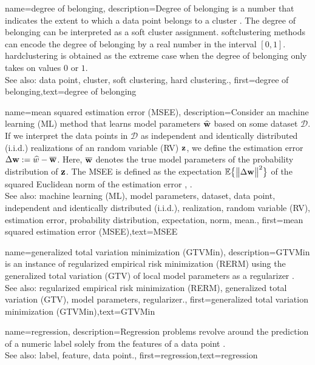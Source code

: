 {name={degree of belonging},
	description={Degree of belonging is a number that indicates the extent to which a data point 
		belongs to a cluster \cite[Ch. 8]{MLBasics}. The degree of belonging can be 
		interpreted as a soft cluster assignment. \Gls{softclustering} methods can 
		encode the degree of belonging by a real number in the interval $[0,1]$. 
		\Gls{hardclustering} is obtained as the extreme case when the degree of belonging 
		only takes on values $0$ or $1$.
					\\ 
		See also: data point, cluster, soft clustering, hard clustering.}, first={degree of belonging},text={degree of belonging} 
}

{name={mean squared estimation error (MSEE)},
	description={Consider an machine learning (ML) method that 
		learns model parameters $\widehat{{\bf w}}$ based on some dataset $\mathcal{D}$. 
		If we interpret the data points in $\mathcal{D}$ as independent and identically distributed (i.i.d.) realizations of an random variable (RV) ${\bf z}$, 
		we define the estimation error $\Delta {\bf w} := \widehat{w} - \overline{{\bf w}}$. 
		Here, $\overline{{\bf w}}$ denotes the true model parameters of the probability distribution 
		of ${\bf z}$. The MSEE is 
		defined as the expectation $\mathbb{E}  \big\{ \big\| \Delta {\bf w} \big\|^{2} \big\}$ of the 
		squared Euclidean norm of the estimation error \cite{LC}, \cite{kay}.
					\\ 
		See also: machine learning (ML), model parameters, dataset, data point, independent and identically distributed (i.i.d.), realization, random variable (RV), estimation error, probability distribution, expectation, norm, mean.},
	first={mean squared estimation error (MSEE)},text={MSEE} 
}

{name={generalized total variation minimization (GTVMin)},
	description={GTVMin is an instance of regularized empirical risk minimization (RERM) 
		using the generalized total variation (GTV) of local model parameters as a regularizer \cite{ClusteredFLTVMinTSP}.
					\\ 
		See also: regularized empirical risk minimization (RERM), generalized total variation (GTV), model parameters, regularizer.},
	first={generalized total variation minimization (GTVMin)},text={GTVMin} 
}

{name={regression},
	description={Regression problems revolve around the 
		prediction of a numeric label solely from the features of a data point \cite[Ch. 2]{MLBasics}.
					\\ 
		See also: label, feature, data point.},
	first={regression},text={regression} 
}

